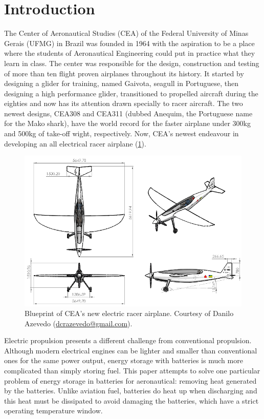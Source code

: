 \section{Introduction}
\label{sec:intro}
 The Center of Aeronautical Studies (CEA) of the Federal University of Minas Gerais (UFMG) in Brazil was founded in 1964 with the aspiration to be a place where the students of Aeronautical Engineering could put in practice what they learn in class. The center was responsible for the design, construction and testing of more than ten flight proven airplanes throughout its history. It started by designing a glider for training, named Gaivota, seagull in Portuguese, then designing a high performance glider, transitioned to propelled aircraft during the eighties and now has its attention drawn specially to racer aircraft. The two newest designs, CEA308 and CEA311 (dubbed Anequim, the Portuguese name for the Mako shark), have the world record for the faster airplane under 300kg and 500kg of take-off wight, respectively. Now, CEA's newest endeavour in developing an all electrical racer airplane (\cref{fig:blueprint}). 
 
 \begin{figure}
     \centering
     \includegraphics[width=\textwidth]{fig/AZX02_AP.png}
     \caption{Blueprint of CEA's new electric racer airplane. Courtesy of Danilo Azevedo (\url{dcrazevedo@gmail.com}).}
     \label{fig:blueprint}
 \end{figure}
 
 Electric propulsion presents a different challenge from conventional propulsion. 
 Although modern electrical engines can be lighter and smaller than conventional ones for the same power output,
  energy storage with batteries is much more complicated than simply storing fuel. This paper attempts to solve one particular problem of energy storage in batteries for aeronautical: removing heat generated by the batteries. Unlike aviation fuel, batteries do heat up when discharging and this heat must be dissipated to avoid damaging the batteries, which have a strict operating temperature window.


